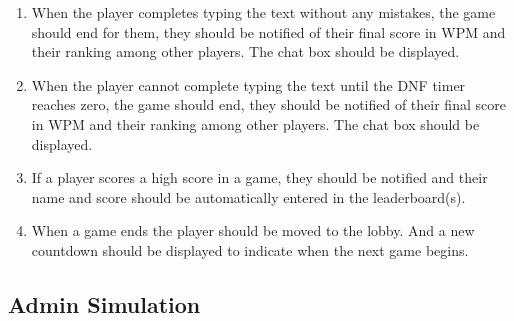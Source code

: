 \documentclass[titlepage]{article}
\begin{document}
\begin{enumerate}
	\item When the player completes typing the text without any mistakes, the game should end for them, they should be notified of their final score in WPM and their ranking among other players. The chat box should be displayed.
	\item  When the player cannot complete typing the text until the DNF timer reaches zero, the game should end, they should be notified of their final score in WPM and their ranking among other players. The chat box should be displayed.
	\item If a player scores a high score in a game, they should be notified and their name and score should be automatically entered in the leaderboard(s).
	\item When a game ends the player should be moved to the lobby. And a new countdown should be displayed to indicate when the next game begins.
\end{enumerate}

\subsection{Admin Simulation}
\end{document}
